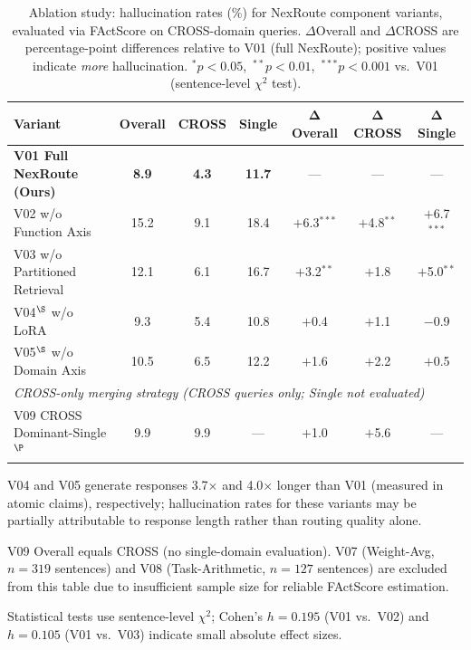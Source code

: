 \begin{table}[t]
\centering
\caption{Ablation study: hallucination rates (\%) for NexRoute component variants,
  evaluated via FActScore on CROSS-domain queries.
  $\Delta$Overall and $\Delta$CROSS are percentage-point differences relative to
  V01 (full NexRoute); positive values indicate \emph{more} hallucination.
  $^*$$p < 0.05$,\ $^{**}$$p < 0.01$,\ $^{***}$$p < 0.001$ vs.\ V01
  (sentence-level $\chi^2$ test).}
\label{tab:factscore_ablation}
\setlength{\tabcolsep}{6pt}
\begin{tabular}{lcccccc}
\toprule
\textbf{Variant}
  & \textbf{Overall}
  & \textbf{CROSS}
  & \textbf{Single}
  & $\boldsymbol{\Delta}$\textbf{Overall}
  & $\boldsymbol{\Delta}$\textbf{CROSS}
  & $\boldsymbol{\Delta}$\textbf{Single} \\
\midrule
\textbf{V01 Full NexRoute (Ours)}
  & \textbf{8.9} & \textbf{4.3} & \textbf{11.7} & --- & --- & --- \\
\midrule
V02 w/o Function Axis
  & 15.2 & 9.1 & 18.4
  & $+$6.3$^{***}$ & $+$4.8$^{**}$ & $+$6.7$^{***}$ \\
V03 w/o Partitioned Retrieval
  & 12.1 & 6.1 & 16.7
  & $+$3.2$^{**}$ & $+$1.8 & $+$5.0$^{**}$ \\
V04$^\S$ w/o LoRA
  & 9.3 & 5.4 & 10.8
  & $+$0.4 & $+$1.1 & $-$0.9 \\
V05$^\S$ w/o Domain Axis
  & 10.5 & 6.5 & 12.2
  & $+$1.6 & $+$2.2 & $+$0.5 \\
\midrule
\multicolumn{7}{l}{\textit{CROSS-only merging strategy (CROSS queries only; Single not evaluated)}} \\
V09 CROSS Dominant-Single$^\P$
  & 9.9 & 9.9 & --- & $+$1.0 & $+$5.6 & --- \\
\bottomrule
\end{tabular}
\begin{tablenotes}[flushleft]\footnotesize
  \item[$\S$] V04 and V05 generate responses 3.7$\times$ and 4.0$\times$ longer than V01
    (measured in atomic claims), respectively; hallucination rates for these variants
    may be partially attributable to response length rather than routing quality alone.
  \item[$\P$] V09 Overall equals CROSS (no single-domain evaluation).
    V07 (Weight-Avg, $n{=}319$ sentences) and V08 (Task-Arithmetic, $n{=}127$ sentences)
    are excluded from this table due to insufficient sample size for reliable
    FActScore estimation.
  \item Statistical tests use sentence-level $\chi^2$; Cohen's $h{=}0.195$
    (V01 vs.\ V02) and $h{=}0.105$ (V01 vs.\ V03) indicate small absolute effect sizes.
\end{tablenotes}
\end{table}
